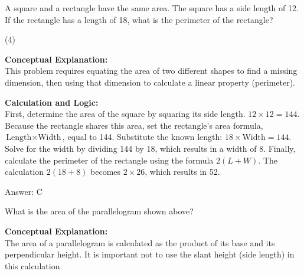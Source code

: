 \documentclass[11pt,paper=a4,answers]{exam}
\begin{document}
\begin{questions}
\question
A square and a rectangle have the same area. The square has a side length of 12. If the rectangle has a length of 18, what is the perimeter of the rectangle?
\begin{tasks}(4)
\end{tasks}

\begin{solution}
\textbf{Conceptual Explanation:} \\
This problem requires equating the area of two different shapes to find a missing dimension, then using that dimension to calculate a linear property (perimeter).

\vspace{30pt}

\textbf{Calculation and Logic:} \\
First, determine the area of the square by squaring its side length. $12 \times 12 = 144$. Because the rectangle shares this area, set the rectangle's area formula, $\text{Length} \times \text{Width}$, equal to 144. Substitute the known length: $18 \times \text{Width} = 144$. Solve for the width by dividing 144 by 18, which results in a width of 8. Finally, calculate the perimeter of the rectangle using the formula $2(L + W)$. The calculation $2(18 + 8)$ becomes $2 \times 26$, which results in 52.

\vspace{30pt}

Answer: \colorbox{yellow!100}{C}
\end{solution}

\vspace{60pt}

\question
\begin{center}
\end{center}
What is the area of the parallelogram shown above?

\begin{solution}
\textbf{Conceptual Explanation:} \\
The area of a parallelogram is calculated as the product of its base and its perpendicular height. It is important not to use the slant height (side length) in this calculation.


\end{solution}
\end{questions}
\end{document}
